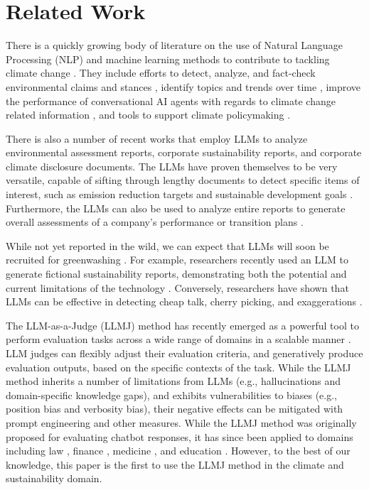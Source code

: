 \section{Related Work}
There is a quickly growing body of literature on the use of Natural Language Processing (NLP) and machine learning methods to contribute to tackling climate change \cite{stede2021climate,rolnick2022tackling}. They include efforts to detect, analyze, and fact-check environmental claims and stances \cite{leippold2023environmental,luo2020detecting,coan2021computer,piskorski2022exploring,gehring2023analyzing,diggelmann2020climate}, identify topics and trends over time \cite{yim2023meticulously,brie2024mandatory}, improve the performance of conversational AI agents with regards to climate change related information \cite{webersinke2021climatebert,vaghefi2023chatclimate,bulian2023assessing}, and tools to support climate policymaking \cite{callaghan2021machine,planas2022beyond}.

There is also a number of recent works that employ LLMs to analyze environmental assessment reports, corporate sustainability reports, and corporate climate disclosure documents. The LLMs have proven themselves to be very versatile, capable of sifting through lengthy documents to detect specific items of interest, such as emission reduction targets \cite{schimanski2023climatebert} and sustainable development goals \cite{garigliotti2024sdg}. Furthermore, the LLMs can also be used to analyze entire reports to generate overall assessments of a company’s performance or transition plans \cite{ni2023chatreport,colesanti2024combining}.

While not yet reported in the wild, we can expect that LLMs will soon be recruited for greenwashing \cite{moodaley2023greenwashing}. For example, researchers recently used an LLM to generate fictional sustainability reports, demonstrating both the potential and current limitations of the technology \cite{de2024will}. Conversely, researchers have shown that LLMs can be effective in detecting cheap talk, cherry picking, and exaggerations \cite{bingler2022cheap,luo2024unmasking}. 

The LLM-as-a-Judge (LLMJ) method has recently emerged as a powerful tool to perform evaluation tasks across a wide range of domains in a scalable manner \cite{zheng2023judging}. LLM judges can flexibly adjust their evaluation criteria, and generatively produce evaluation outputs, based on the specific contexts of the task. While the LLMJ method inherits a number of limitations from LLMs (e.g., hallucinations and domain-specific knowledge gaps), and exhibits vulnerabilities to biases (e.g., position bias and verbosity bias), their negative effects can be mitigated with prompt engineering and other measures. While the LLMJ method was originally proposed for evaluating chatbot responses, it has since been applied to domains including law \cite{yue2023disc}, finance \cite{son2024krx}, medicine \cite{xie2024doclens}, and education \cite{chiang2024large,wang2024automated}. However, to the best of our knowledge, this paper is the first to use the LLMJ method in the climate and sustainability domain.